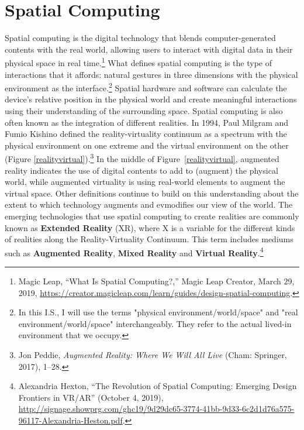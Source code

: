 \section{Spatial Computing}
Spatial computing is the digital technology that blends computer-generated contents with the real world, allowing users to interact with digital data in their physical space in real time.\footnote{Magic Leap, “What Is Spatial Computing?,” Magic Leap Creator, March 29, 2019, \url{https://creator.magicleap.com/learn/guides/design-spatial-computing}.} What defines spatial computing is the type of interactions that it affords: natural gestures in three dimensions with the physical environment as the interface.\footnote{In this I.S., I will use the terms "physical environment/world/space" and "real environment/world/space" interchangeably. They refer to the actual lived-in environment that we occupy.}  Spatial hardware and software can calculate the device's relative position in the physical world and create meaningful interactions using their understanding of the surrounding space. Spatial computing is also often known as the integration of different realities. In 1994, Paul Milgram and Fumio Kishino defined the reality-virtuality continuum as a spectrum with the physical environment on one extreme and the  virtual environment on the other (Figure \ref{realityvirtual}).\footnote{Jon Peddie, \textit{Augmented Reality: Where We Will All Live} (Cham: Springer, 2017), 1–28.} In the middle of Figure~\ref{realityvirtual}, augmented reality indicates the use of digital contents to add to (augment) the physical world, while augmented virtuality is using real-world elements to augment the virtual space. Other definitions continue to build on this understanding about the extent to which technology augments and ev\en modifies our view of the world. The emerging technologies that use spatial computing to create realities are commonly known as \textbf{Extended Reality} (XR), where X is a variable for the different kinds of realities along the Reality-Virtuality Continuum. This term includes mediums such as \textbf{Augmented Reality}, \textbf{Mixed Reality} and \textbf{Virtual Reality}.\footnote{Alexandria Hexton, “The Revolution of Spatial Computing: Emerging Design Frontiers in VR/AR” (October 4, 2019), \url{http://signage.showprg.com/ghc19/9d29dc65-3774-41bb-9d33-6c2d1d76a575-96117-Alexandria-Heston.pdf}.}

\begin{figure}[!ht]
\end{figure}


